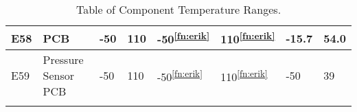\begin{longtable}{|m{1cm}|m{3.5cm}|m{1.3cm}|m{1.3cm}|m{1.4cm}|m{1.3cm}|m{1.3cm}|m{1.3cm}|}
E58 & PCB & -50 & 110 & -50\textsuperscript{\ref{fn:erik}} & 110\textsuperscript{\ref{fn:erik}} & -15.7 & 54.0 \\ \hline
E59 & Pressure Sensor PCB & -50 & 110 & -50\textsuperscript{\ref{fn:erik}} & 110\textsuperscript{\ref{fn:erik}} & -50 & 39 \\ \hline


\caption{Table of Component Temperature Ranges.}
\label{tab:thermal-table-4}
\end{longtable}
\raggedbottom








